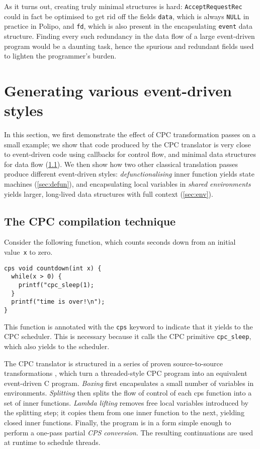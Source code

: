 \documentclass[a4paper]{llncs}
\begin{document}
As it turns out, creating truly minimal structures is hard:
\texttt{AcceptRequestRec} could in fact be optimised to get rid off the fields
\texttt{data}, which is always \texttt{NULL} in practice in Polipo, and
\texttt{fd}, which is also present in the encapsulating \texttt{event} data
structure.  Finding every such redundancy in the data flow of a large
event-driven program would be a daunting task, hence the spurious and
redundant fields used to lighten the programmer's burden.


\section{Generating various event-driven styles}
\label{sec:generating}

In this section, we first demonstrate the effect of CPC transformation passes on
a small example; we show that code produced by the CPC translator is very close
to event-driven code using callbacks for control flow, and minimal data
structures for data flow (\cref{sec:cpc}).  We then show how two other classical
translation passes produce different event-driven styles:
\emph{defunctionalising} inner function yields state machines
(\cref{sec:defun}), and encapsulating local variables in \emph{shared
environments} yields larger, long-lived data structures with full context
(\cref{sec:env}).

\subsection{The CPC compilation technique}
\label{sec:cpc}

Consider the following function, which counts seconds down from an initial
value~\texttt{x} to zero.
\begin{lstlisting}
cps void countdown(int x) {
  while(x > 0) {
    printf("cpc_sleep(1);
  }
  printf("time is over!\n");
}
\end{lstlisting}
This function is annotated with the \texttt{cps} keyword to indicate that it
yields to the CPC scheduler.  This is necessary because it calls the CPC
primitive \texttt{cpc\_sleep}, which also yields to the scheduler.

The CPC translator is structured in a series of proven source-to-source
transformations \cite{kerneis2011}, which turn a threaded-style CPC program into
an equivalent event-driven C program.  \emph{Boxing} first encapsulates a small
number of variables in environments.  \emph{Splitting} then splits the flow of
control of each cps function into a set of inner functions.
\emph{Lambda lifting} removes free local variables introduced by the splitting
step; it copies them from one inner function to the next, yielding closed inner
functions.  Finally, the program is in a form simple enough to perform a
one-pass partial \emph{CPS conversion}.  The resulting continuations are used at
runtime to schedule threads.
\end{document}
